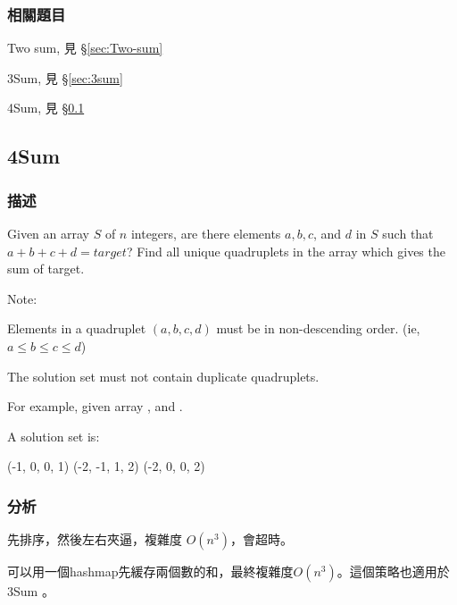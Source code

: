 \subsubsection{相關題目}
\begindot
\item Two sum, 見 \S \ref{sec:Two-sum}
\item 3Sum, 見 \S \ref{sec:3sum}
\item 4Sum, 見 \S \ref{sec:4sum}
\myenddot


\subsection{4Sum} %
\label{sec:4sum}


\subsubsection{描述}
Given an array $S$ of $n$ integers, are there elements $a, b, c$, and $d$ in $S$ such that $a + b + c + d = target$? Find all unique quadruplets in the array which gives the sum of target.

Note:
\begindot
\item Elements in a quadruplet $(a,b,c,d)$ must be in non-descending order. (ie, $a \leq b \leq c \leq d$)
\item The solution set must not contain duplicate quadruplets.
\myenddot

For example, given array , and .

A solution set is:
\begin{Code}
(-1,  0, 0, 1)
(-2, -1, 1, 2)
(-2,  0, 0, 2)
\end{Code}


\subsubsection{分析}
先排序，然後左右夾逼，複雜度 $O(n^3)$，會超時。

可以用一個hashmap先緩存兩個數的和，最終複雜度$O(n^3)$。這個策略也適用於 3Sum 。


